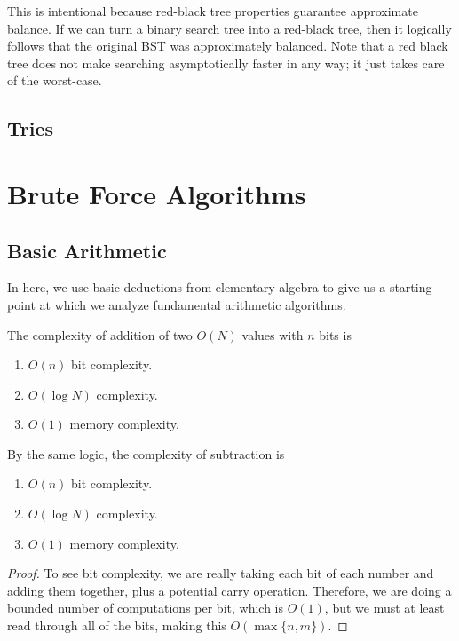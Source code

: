\documentclass{article}
\begin{document}
    This is intentional because red-black tree properties guarantee approximate balance. If we can turn a binary search tree into a red-black tree, then it logically follows that the original BST was approximately balanced. Note that a red black tree does not make searching asymptotically faster in any way; it just takes care of the worst-case. 

  \subsection{Tries}

\section{Brute Force Algorithms} 

  \subsection{Basic Arithmetic}

    In here, we use basic deductions from elementary algebra to give us a starting point at which we analyze fundamental arithmetic algorithms. 

    \begin{theorem}
      The complexity of addition of two $O(N)$ values with $n$ bits is
      \begin{enumerate}
        \item $O(n)$ bit complexity. 
        \item $O(\log N)$ complexity. 
        \item $O(1)$ memory complexity. 
      \end{enumerate}
      By the same logic, the complexity of subtraction is 
      \begin{enumerate}
        \item $O(n)$ bit complexity. 
        \item $O(\log N)$ complexity. 
        \item $O(1)$ memory complexity. 
      \end{enumerate}
    \end{theorem}
    \begin{proof}
      To see bit complexity, we are really taking each bit of each number and adding them together, plus a potential carry operation. Therefore, we are doing a bounded number of computations per bit, which is $O(1)$, but we must at least read through all of the bits, making this $O(\max\{n, m\})$. 
    \end{proof}
\end{document}
